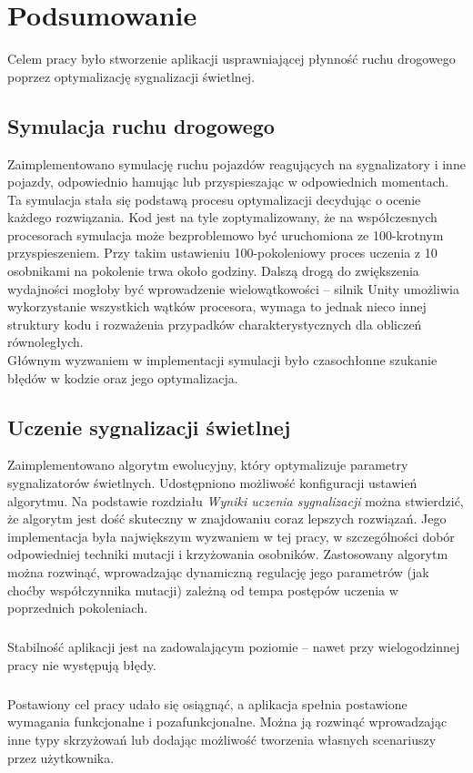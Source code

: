 \chapter*{Podsumowanie}
Celem pracy było stworzenie aplikacji usprawniającej płynność ruchu drogowego poprzez optymalizację sygnalizacji świetlnej.
\section*{Symulacja ruchu drogowego}
Zaimplementowano symulację ruchu pojazdów reagujących na sygnalizatory i inne pojazdy, odpowiednio hamując lub przyspieszając w odpowiednich momentach. Ta symulacja stała się podstawą procesu optymalizacji decydując o ocenie każdego rozwiązania. Kod jest na tyle zoptymalizowany, że na współczesnych procesorach symulacja może bezproblemowo być uruchomiona ze 100-krotnym przyspieszeniem. Przy takim ustawieniu 100-pokoleniowy proces uczenia z 10 osobnikami na pokolenie trwa około godziny. Dalszą drogą do zwiększenia wydajności mogłoby być wprowadzenie wielowątkowości -- silnik Unity umożliwia wykorzystanie wszystkich wątków procesora, wymaga to jednak nieco innej struktury kodu i rozważenia przypadków charakterystycznych dla obliczeń równoległych.\\
Głównym wyzwaniem w implementacji symulacji było czasochłonne szukanie błędów w kodzie oraz jego optymalizacja.
\section*{Uczenie sygnalizacji świetlnej}
Zaimplementowano algorytm ewolucyjny, który optymalizuje parametry sygnalizatorów świetlnych. Udostępniono możliwość konfiguracji ustawień algorytmu. Na podstawie rozdziału \textit{Wyniki uczenia sygnalizacji} można stwierdzić, że algorytm jest dość skuteczny w znajdowaniu coraz lepszych rozwiązań. Jego implementacja była największym wyzwaniem w tej pracy, w szczególności dobór odpowiedniej techniki mutacji i krzyżowania osobników. Zastosowany algorytm można rozwinąć, wprowadzając dynamiczną regulację jego parametrów (jak choćby współczynnika mutacji) zależną od tempa postępów uczenia w poprzednich pokoleniach.
\paragraph{} 
Stabilność aplikacji jest na zadowalającym poziomie -- nawet przy wielogodzinnej pracy nie występują błędy.
\paragraph{} 
Postawiony cel pracy udało się osiągnąć, a aplikacja spełnia postawione wymagania funkcjonalne i pozafunkcjonalne. Można ją rozwinąć wprowadzając inne typy skrzyżowań lub dodając możliwość tworzenia własnych scenariuszy przez użytkownika.